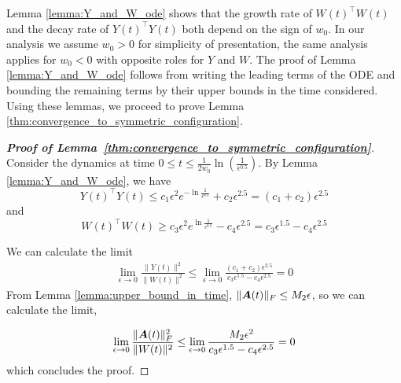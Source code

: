 Lemma \ref{lemma:Y_and_W_ode} shows that the growth rate of $W(t)^\top W(t)$ and the decay rate of $Y(t)^\top Y(t)$ both depend on the sign of $w_0$. In our analysis we assume $w_0>0$ for simplicity of presentation, the same analysis applies for $w_0<0$ with opposite roles for $Y$ and $W$. The proof of Lemma \ref{lemma:Y_and_W_ode} follows from writing the leading terms of the ODE and bounding the remaining terms by their upper bounds in the time considered.
Using these lemmas, we proceed to prove Lemma \ref{thm:convergence_to_symmetric_configuration}. 

\begin{proof}[\textbf{Proof of Lemma~\ref{thm:convergence_to_symmetric_configuration}}]
Consider the dynamics at time $0\le t\le \frac{1}{2w_0}\ln{\left( \frac{1}{\epsilon^{0.5}}\right)}$.
By Lemma \ref{lemma:Y_and_W_ode}, we have
\begin{equation}
    Y(t)^\top Y(t)\le c_1\epsilon^2 e^{-\ln{\frac{1}{\epsilon^{0.5}}}}+c_2 \epsilon^{2.5}=(c_1+c_2)\epsilon^{2.5}
\end{equation}
and
\begin{equation}
    W(t)^\top W(t)\ge c_3\epsilon^2 e^{\ln{\frac{1}{\epsilon^{0.5}}}}-c_4 \epsilon^{2.5}=c_3\epsilon^{1.5} - c_4\epsilon^{2.5}
\end{equation}

We can calculate the limit
\begin{align}
     \lim_{\epsilon\rightarrow 0} \frac{\|Y(t)\|^2}{\|W(t)\|^2}\le\lim_{\epsilon\rightarrow 0}\frac{(c_1+c_2)\epsilon^{2.5}}{c_3\epsilon^{1.5}-c_4\epsilon^{2.5}}=0
\end{align}
From Lemma \ref{lemma:upper_bound_in_time}, $\|{\bm{A}}(t)\|_F\le M_2\epsilon$, so we can calculate the limit,

\begin{equation}
    \lim_{\epsilon\rightarrow 0} \frac{\|{\bm{A}}(t)\|_F^2}{\|W(t)\|^2} \le\lim_{\epsilon\rightarrow 0}\frac{M_2\epsilon^2}{c_3\epsilon^{1.5}-c_4\epsilon^{2.5}}=0
\end{equation}
which concludes the proof.
\end{proof}


